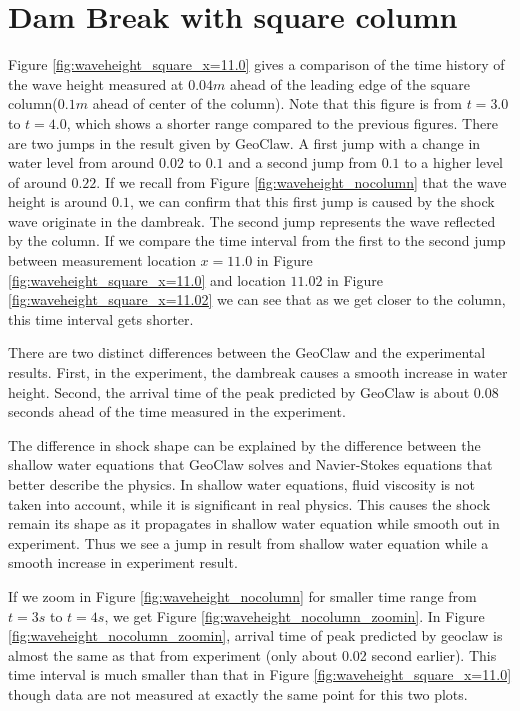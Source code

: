 \documentclass[11pt]{article}
\begin{document}
\section{Dam Break with square column}\label{Sec:Square}
Figure \ref{fig:waveheight_square_x=11.0} gives a comparison of the time history of the wave height measured at $0.04m$ ahead of the leading edge of the square column($0.1m$ ahead of center of the column).
Note that this figure is from $t=3.0$ to $t=4.0$, which shows a shorter range compared to the previous figures.
There are two jumps in the result given by GeoClaw. A first jump with a change in water level from around $0.02$ to $0.1$ and a second jump from $0.1$ to a higher level of around $0.22$.
If we recall from Figure \ref{fig:waveheight_nocolumn} that the wave height is around $0.1$, we can confirm that this first jump is caused by the shock wave originate in the dambreak. The second jump represents the wave reflected by the column.  
If we compare the time interval from the first to the second jump between measurement location $x=11.0$ in Figure \ref{fig:waveheight_square_x=11.0} and location $11.02$ in Figure \ref{fig:waveheight_square_x=11.02} we can see that as we get closer to the column, this time interval gets shorter.
\par
There are two distinct differences between the GeoClaw and the experimental results. First, in the experiment, the dambreak causes a smooth increase in water height. Second, the arrival time of the peak predicted by GeoClaw is about $0.08$ seconds ahead of the time measured in the experiment.  
\par
The difference in shock shape can be explained by the difference between the shallow water equations that GeoClaw solves and Navier-Stokes equations that better describe the physics.
In shallow water equations, fluid viscosity is not taken into account, while it is significant in real physics.
This causes the shock remain its shape as it propagates in shallow water equation while smooth out in experiment.
Thus we see a jump in result from shallow water equation while a smooth increase in experiment result.
\par
If we zoom in Figure \ref{fig:waveheight_nocolumn} for smaller time range from $t=3s$ to $t=4s$, we get Figure \ref{fig:waveheight_nocolumn_zoomin}.
In Figure \ref{fig:waveheight_nocolumn_zoomin}, arrival time of peak predicted by geoclaw is almost the same as that from experiment (only about 0.02 second earlier).  
This time interval is much smaller than that in Figure \ref{fig:waveheight_square_x=11.0} though data are not measured at exactly the same point for this two plots. 
\end{document}
